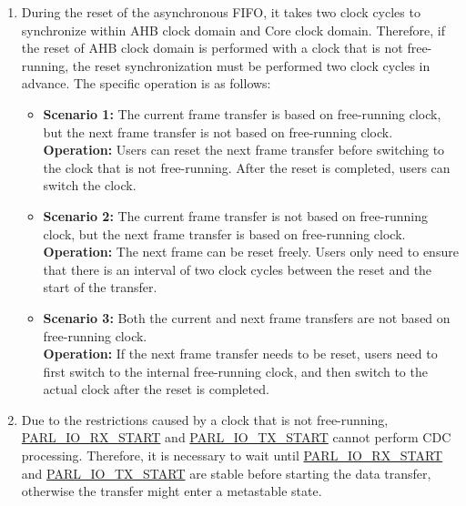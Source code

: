 \documentclass[main\_\_EN.tex]{subfiles}
\begin{document}
\begin{enumerate}
    \item During the reset of the asynchronous FIFO, it takes two clock cycles to synchronize within AHB clock domain and Core clock domain. Therefore, if the reset of AHB clock domain is performed with a clock that is not free-running, the reset synchronization must be performed two clock cycles in advance. The specific operation is as follows:
    \begin{itemize}
        \item \textbf{Scenario 1:} The current frame transfer is based on free-running clock, but the next frame transfer is not based on free-running clock. \\
        \textbf{Operation:} Users can reset the next frame transfer before switching to the clock that is not free-running. After the reset is completed, users can switch the clock.
        \item \textbf{Scenario 2:} The current frame transfer is not based on free-running clock, but the next frame transfer is based on free-running clock.\\
        \textbf{Operation:} The next frame can be reset freely. Users only need to ensure that there is an interval of two clock cycles between the reset and the start of the transfer.
        \item \textbf{Scenario 3:} Both the current and next frame transfers are not based on free-running clock. \\
        \textbf{Operation:} If the next frame transfer needs to be reset, users need to first switch to the internal free-running clock, and then switch to the actual clock after the reset is completed. 
    \end{itemize}
    
    \item Due to the restrictions caused by a clock that is not free-running, \hyperref[fielddesc:PARLIORXSTART]{PARL\_IO\_RX\_START} and \hyperref[fielddesc:PARLIOTXSTART]{PARL\_IO\_TX\_START} cannot perform CDC processing. Therefore, it is necessary to wait until \hyperref[fielddesc:PARLIORXSTART]{PARL\_IO\_RX\_START} and \hyperref[fielddesc:PARLIOTXSTART]{PARL\_IO\_TX\_START} are stable before starting the data transfer, otherwise the transfer might enter a metastable state. 
    

\end{enumerate}
\end{document}
